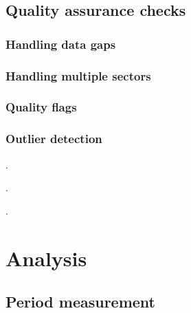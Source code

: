 \documentclass[modern]{aastex631}
\begin{document}
\subsection{Quality assurance checks}

\subsubsection{Handling data gaps}

\subsubsection{Handling multiple sectors}

\subsubsection{Quality flags}

\subsubsection{Outlier detection}

.

.

.


\section{Analysis}

\subsection{Period measurement}
\end{document}
